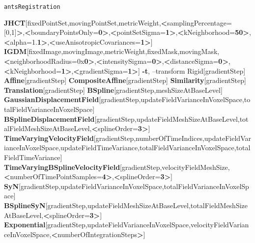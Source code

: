 \documentclass[ignorenonframetext,]{beamer}
\newenvironment{Shaded}{\begin{snugshade}}{\end{snugshade}}
\newcommand{\KeywordTok}[1]{\textcolor[rgb]{0.13,0.29,0.53}{\textbf{{#1}}}}
\newcommand{\NormalTok}[1]{{#1}}
\begin{document}
\begin{frame}[fragile]{\texttt{antsRegistration}}
\begin{Shaded}
\begin{Highlighting}[]
                  \KeywordTok{JHCT}\NormalTok{[fixedPointSet,movingPointSet,metricWeight,}\KeywordTok{<}\NormalTok{samplingPercentage=[0,1]}\KeywordTok{>}\NormalTok{,}\KeywordTok{<}\NormalTok{boundaryPointsOnly=}\KeywordTok{0>}\NormalTok{,}\KeywordTok{<}\NormalTok{pointSetSigma=}\KeywordTok{1>}\NormalTok{,}\KeywordTok{<}\NormalTok{kNeighborhood=}\KeywordTok{50>}\NormalTok{,}\KeywordTok{<}\NormalTok{alpha=1.}\KeywordTok{1>}\NormalTok{,}\KeywordTok{<}\NormalTok{useAnisotropicCovariances=}\KeywordTok{1>}\NormalTok{]}
                  \KeywordTok{IGDM}\NormalTok{[fixedImage,movingImage,metricWeight,fixedMask,movingMask,}\KeywordTok{<}\NormalTok{neighborhoodRadius=0x}\KeywordTok{0>}\NormalTok{,}\KeywordTok{<}\NormalTok{intensitySigma=}\KeywordTok{0>}\NormalTok{,}\KeywordTok{<}\NormalTok{distanceSigma=}\KeywordTok{0>}\NormalTok{,}\KeywordTok{<}\NormalTok{kNeighborhood=}\KeywordTok{1>}\NormalTok{,}\KeywordTok{<}\NormalTok{gradientSigma=}\KeywordTok{1>}\NormalTok{]}
     \KeywordTok{-t}\NormalTok{, --transform Rigid[gradientStep]}
                     \KeywordTok{Affine}\NormalTok{[gradientStep]}
                     \KeywordTok{CompositeAffine}\NormalTok{[gradientStep]}
                     \KeywordTok{Similarity}\NormalTok{[gradientStep]}
                     \KeywordTok{Translation}\NormalTok{[gradientStep]}
                     \KeywordTok{BSpline}\NormalTok{[gradientStep,meshSizeAtBaseLevel]}
                     \KeywordTok{GaussianDisplacementField}\NormalTok{[gradientStep,updateFieldVarianceInVoxelSpace,totalFieldVarianceInVoxelSpace]}
                     \KeywordTok{BSplineDisplacementField}\NormalTok{[gradientStep,updateFieldMeshSizeAtBaseLevel,totalFieldMeshSizeAtBaseLevel,}\KeywordTok{<}\NormalTok{splineOrder=}\KeywordTok{3>}\NormalTok{]}
                     \KeywordTok{TimeVaryingVelocityField}\NormalTok{[gradientStep,numberOfTimeIndices,updateFieldVarianceInVoxelSpace,updateFieldTimeVariance,totalFieldVarianceInVoxelSpace,totalFieldTimeVariance]}
                     \KeywordTok{TimeVaryingBSplineVelocityField}\NormalTok{[gradientStep,velocityFieldMeshSize,}\KeywordTok{<}\NormalTok{numberOfTimePointSamples=}\KeywordTok{4>}\NormalTok{,}\KeywordTok{<}\NormalTok{splineOrder=}\KeywordTok{3>}\NormalTok{]}
                     \KeywordTok{SyN}\NormalTok{[gradientStep,updateFieldVarianceInVoxelSpace,totalFieldVarianceInVoxelSpace]}
                     \KeywordTok{BSplineSyN}\NormalTok{[gradientStep,updateFieldMeshSizeAtBaseLevel,totalFieldMeshSizeAtBaseLevel,}\KeywordTok{<}\NormalTok{splineOrder=}\KeywordTok{3>}\NormalTok{]}
                     \KeywordTok{Exponential}\NormalTok{[gradientStep,updateFieldVarianceInVoxelSpace,velocityFieldVarianceInVoxelSpace,}\KeywordTok{<}\NormalTok{numberOfIntegrationSteps}\KeywordTok{>}\NormalTok{]}

\end{Highlighting}
\end{Shaded}
\end{frame}
\end{document}
